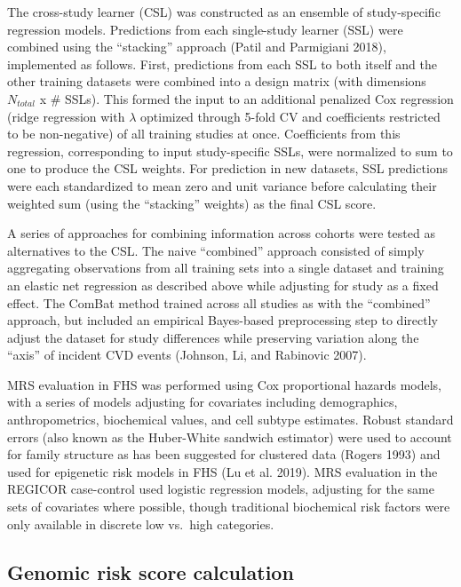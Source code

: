 \documentclass[]{article}
\begin{document}
The cross-study learner (CSL) was constructed as an ensemble of
study-specific regression models. Predictions from each single-study
learner (SSL) were combined using the ``stacking'' approach (Patil and
Parmigiani 2018), implemented as follows. First, predictions from each
SSL to both itself and the other training datasets were combined into a
design matrix (with dimensions \(N_{total}\) x \# SSLs). This formed the
input to an additional penalized Cox regression (ridge regression with
\(\lambda\) optimized through 5-fold CV and coefficients restricted to
be non-negative) of all training studies at once. Coefficients from this
regression, corresponding to input study-specific SSLs, were normalized
to sum to one to produce the CSL weights. For prediction in new
datasets, SSL predictions were each standardized to mean zero and unit
variance before calculating their weighted sum (using the ``stacking''
weights) as the final CSL score.

A series of approaches for combining information across cohorts were
tested as alternatives to the CSL. The naive ``combined'' approach
consisted of simply aggregating observations from all training sets into
a single dataset and training an elastic net regression as described
above while adjusting for study as a fixed effect. The ComBat method
trained across all studies as with the ``combined'' approach, but
included an empirical Bayes-based preprocessing step to directly adjust
the dataset for study differences while preserving variation along the
``axis'' of incident CVD events (Johnson, Li, and Rabinovic 2007).

MRS evaluation in FHS was performed using Cox proportional hazards
models, with a series of models adjusting for covariates including
demographics, anthropometrics, biochemical values, and cell subtype
estimates. Robust standard errors (also known as the Huber-White
sandwich estimator) were used to account for family structure as has
been suggested for clustered data (Rogers 1993) and used for epigenetic
risk models in FHS (Lu et al. 2019). MRS evaluation in the REGICOR
case-control used logistic regression models, adjusting for the same
sets of covariates where possible, though traditional biochemical risk
factors were only available in discrete low vs.~high categories.

\hypertarget{genomic-risk-score-calculation}{%
\subsection{Genomic risk score
calculation}\label{genomic-risk-score-calculation}}
\end{document}
